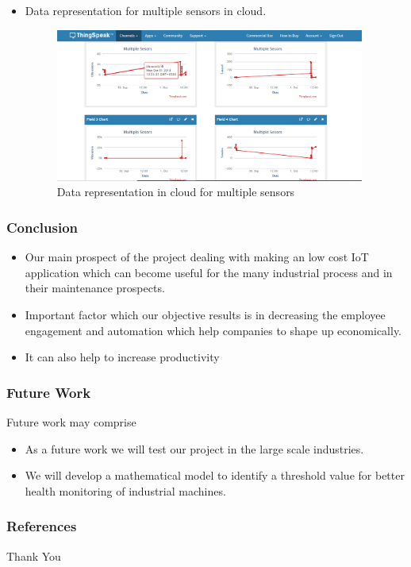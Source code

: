\documentclass{beamer}
\begin{document}
\begin{frame}
\begin{itemize}
\item Data representation for multiple sensors in cloud.
  \begin{figure}
  \centerline{\includegraphics[width=4.0in]{22.JPG}}
  \caption{ \textbf{}Data representation in cloud for multiple sensors}
  \end{figure}
\end{itemize}
\end{frame}

\begin{frame}\frametitle{Conclusion}
\item 
\begin{itemize}
    
\end{itemize}
\begin{itemize}
\item Our main prospect of the project dealing with making an low cost IoT application which can become useful for the many industrial process and in their maintenance prospects.
\item 
Important factor which our objective results is in decreasing the employee engagement and automation  which help companies to shape up economically.
\item It can also help to increase productivity 
\end{itemize}
\end{frame}
\begin{frame}\frametitle{Future Work}
Future work may comprise
\begin{itemize}
\item As a future work we will test our project in the large scale industries.
\item We will develop a mathematical model to identify a threshold value for better health monitoring of industrial machines.
\end{itemize}
\end{frame}
\begin{frame}\frametitle{References}
\begin{itemize}
\printbibliography
\end{itemize}
\end{frame}
\begin{frame}
\Huge
\begin{center}Thank You \end{center}
\end{frame}
\end{document}
